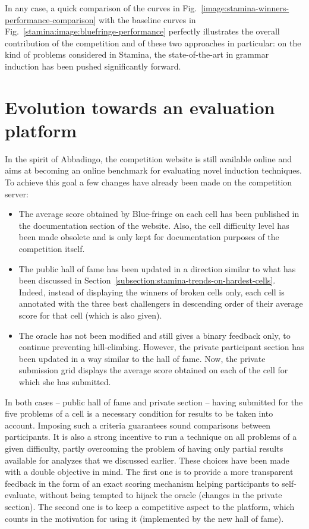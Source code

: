 In any case, a quick comparison of the curves in Fig.~\ref{image:stamina-winners-performance-comparison} with the baseline curves in Fig.~\ref{stamina:image:bluefringe-performance} perfectly illustrates the overall contribution of the competition and of these two approaches in particular: on the kind of problems considered in Stamina, the state-of-the-art in grammar induction has been pushed significantly forward.


\section{Evolution towards an evaluation platform\label{section:stamina-platform}}

In the spirit of Abbadingo, the competition website is still available online and aims at becoming an online benchmark for evaluating novel induction techniques. To achieve this goal a few changes have already been made on the competition server:

\begin{itemize}

\item The average score obtained by Blue-fringe on each cell has been published in the documentation section of the website. Also, the cell difficulty level has been made obsolete and is only kept for documentation purposes of the competition itself.

\item The public hall of fame has been updated in a direction similar to what has been discussed in Section~\ref{subsection:stamina-trends-on-hardest-cells}. Indeed, instead of displaying the winners of broken cells only, each cell is annotated with the three best challengers in descending order of their average score for that cell (which is also given). 

\item The oracle has not been modified and still gives a binary feedback only, to continue preventing hill-climbing. However, the private participant section has been updated in a way similar to the hall of fame. Now, the private submission grid displays the average score obtained on each of the cell for which she has submitted.

\end{itemize}

In both cases -- public hall of fame and private section -- having submitted for the five problems of a cell is a necessary condition for results to be taken into account. Imposing such a criteria guarantees sound comparisons between participants. It is also a strong incentive to run a technique on all problems of a given difficulty, partly overcoming the problem of having only partial results available for analyzes that we discussed earlier. These choices have been made with a double objective in mind. The first one is to provide a more transparent feedback in the form of an exact scoring mechanism helping participants to self-evaluate, without being tempted to hijack the oracle (changes in the private section). The second one is to keep a competitive aspect to the platform, which counts in the motivation for using it (implemented by the new hall of fame). 

